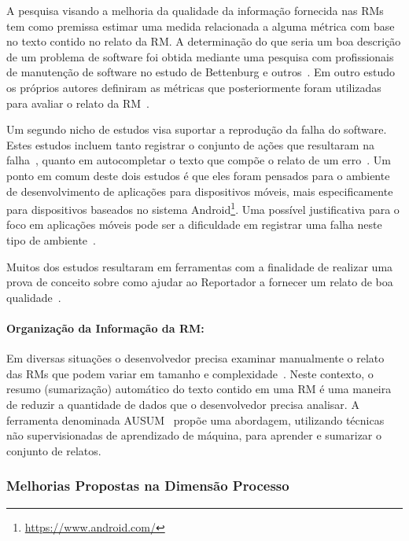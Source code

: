 A pesquisa visando a melhoria da qualidade da informação fornecida nas RMs tem
como premissa estimar uma medida relacionada a alguma métrica com base no texto
contido no relato da RM\@. A determinação do que seria um boa descrição de um
problema de software foi obtida mediante uma pesquisa com profissionais de
manutenção de software no estudo de Bettenburg e outros~\cite{Bettenburg2008a}.
Em outro estudo os próprios autores definiram as métricas que posteriormente
foram utilizadas para avaliar o relato da RM~\cite{Tu:2014:MQI:2677832.2677844}.

Um segundo nicho de estudos visa suportar a reprodução da falha do software.
Estes estudos incluem tanto registrar o conjunto de ações que resultaram na
falha~\cite{White:2015:GRR:2820282.2820291}, quanto em autocompletar o texto que
compõe o relato de um erro~\cite{moran2015auto}. Um ponto em comum deste dois
estudos é que eles foram pensados para o ambiente de desenvolvimento de
aplicações para dispositivos móveis, mais especificamente para dispositivos
baseados no sistema Android\footnote{\url{https://www.android.com/}}. Uma
possível justificativa para o foco em aplicações móveis pode ser a
dificuldade em registrar uma falha neste tipo de
ambiente~\cite{White:2015:GRR:2820282.2820291, moran2015auto}.

Muitos dos estudos resultaram em ferramentas com a finalidade de realizar uma
prova de conceito sobre como ajudar ao Reportador a fornecer um relato de boa
qualidade~\cite{Tu:2014:MQI:2677832.2677844, Bettenburg2008a,
    Wu2011a,White:2015:GRR:2820282.2820291,moran2015auto}.

\paragraph{Organização da Informação da RM:}

Em diversas situações o desenvolvedor precisa examinar manualmente o relato das
RMs que podem variar em tamanho e complexidade~\cite{mani2012ausum}. Neste
contexto, o resumo (sumarização) automático do texto contido em uma RM é uma
maneira de reduzir a quantidade de dados que o desenvolvedor precisa analisar.
A ferramenta denominada AUSUM~\cite{mani2012ausum} propõe uma abordagem,
utilizando técnicas não supervisionadas de aprendizado de máquina, para aprender
e sumarizar o conjunto de relatos.

\subsubsection{Melhorias Propostas na Dimensão Processo}
\label{ssub:melhorias_dim_processo}

